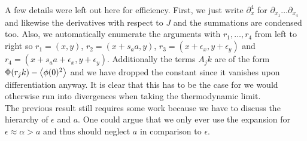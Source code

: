 \documentclass[english, parskip=full]{scrartcl}
\begin{document}
A few details were left out here for efficiency.
First, we just write $\partial_x^4$ for $\partial_{x_1}\dots \partial_{x_4}$ and likewise the derivatives with respect to $J$ and the summations are condensed too.
Also, we automatically enumerate the arguments with $r_1,\dots,r_4$ from left to right so $r_1=(x,y)$, $r_2=(x+s_aa,y)$, $r_3=(x+\epsilon_x,y+\epsilon_y)$ and $r_4=(x+s_aa+\epsilon_x,y+\epsilon_y)$.
Additionally the terms $A_jk$ are of the form $\Phi(r_jk) - \bra*{\phi(0)^2}$ and we have dropped the constant since it vanishes upon differentiation anyway.
It is clear that this has to be the case for we would otherwise run into divergences when taking the thermodynamic limit.\\
The previous result still requires some work because we have to discuss the hierarchy of $\epsilon$ and $a$.
One could argue that we only ever use the expansion for $\epsilon \approx \alpha > a$ and thus should neglect $a$ in comparison to $\epsilon$.
\\
\end{document}
